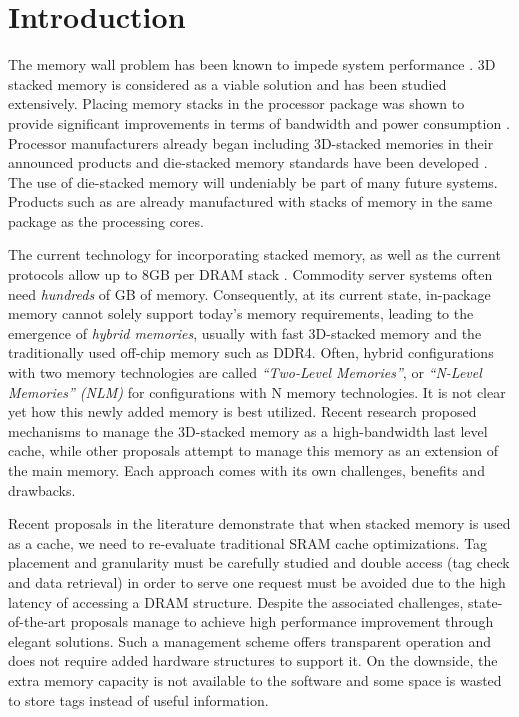\section{Introduction}
\label{sec:Introduction}

The memory wall problem has been known to impede system performance \cite{wulf-can95}. 3D stacked memory is considered as a viable solution and has been studied extensively. Placing memory stacks in the processor package was shown to provide significant improvements in terms of bandwidth and power consumption \cite{black-micro2013}. Processor manufacturers already began including 3D-stacked memories in their announced products \cite{KnightsLanding,NVIDIA,black-micro2013} and die-stacked memory standards have been developed \cite{jedec-wideio,JEDEC-HBM,pawlowski-hotchips2011}. The use of die-stacked memory will undeniably be part of many future systems. Products such as  are already manufactured with stacks of memory in the same package as the processing cores.

The current technology for incorporating stacked memory, as well as the current protocols allow up to 8GB per DRAM stack \cite{JEDEC-HBM-REVISED}. Commodity server systems often need {\em hundreds} of GB of memory. Consequently, at its current state, in-package memory cannot solely support today's memory requirements, leading to the emergence of \emph{hybrid memories}, usually with fast 3D-stacked memory and the traditionally used off-chip memory such as DDR4. Often, hybrid configurations with two memory technologies are called \emph{``Two-Level Memories''}, or \emph{``N-Level Memories'' (NLM)} for configurations with N memory technologies. It is not clear yet how this newly added memory is best utilized. Recent research proposed mechanisms to manage the 3D-stacked memory as a high-bandwidth last level cache, while other proposals attempt to manage this memory as an extension of the main memory. Each approach comes with its own challenges, benefits and drawbacks. 

Recent proposals in the literature \cite{chou-micro2014,qureshi-micro2012} demonstrate that when stacked memory is used as a cache, we need to re-evaluate traditional SRAM cache optimizations. Tag placement and granularity must be carefully studied and double access (tag check and data retrieval) in order to serve one request must be avoided due to the high latency of accessing a DRAM structure. Despite the associated challenges, state-of-the-art proposals manage to achieve high performance improvement through elegant solutions. Such a management scheme offers transparent operation and does not require added hardware structures to support it. On the downside, the extra memory capacity is not available to the software and some space is wasted to store tags instead of useful information.

